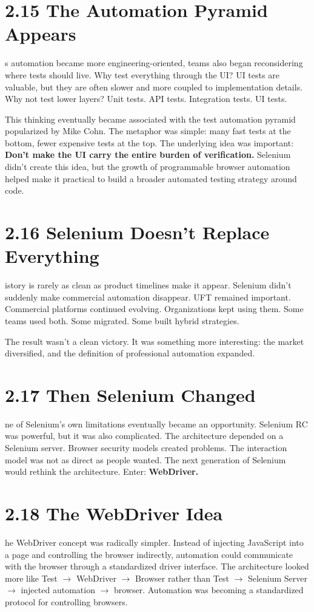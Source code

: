 \documentclass[11pt, a4paper, openany]{book}
\newcommand{\initialcap}[1]{{\fontfamily{lmss}\selectfont\huge\textbf{#1}}}
\begin{document}
\section{2.15 The Automation Pyramid Appears}
\noindent \initialcap{A}s automation became more engineering-oriented, teams also began reconsidering where tests should live. Why test everything through the UI? UI tests are valuable, but they are often slower and more coupled to implementation details. Why not test lower layers? Unit tests. API tests. Integration tests. UI tests.

This thinking eventually became associated with the test automation pyramid popularized by Mike Cohn. The metaphor was simple: many fast tests at the bottom, fewer expensive tests at the top. The underlying idea was important: \textbf{Don't make the UI carry the entire burden of verification.} Selenium didn't create this idea, but the growth of programmable browser automation helped make it practical to build a broader automated testing strategy around code.

\section{2.16 Selenium Doesn't Replace Everything}
\noindent \initialcap{H}istory is rarely as clean as product timelines make it appear. Selenium didn't suddenly make commercial automation disappear. UFT remained important. Commercial platforms continued evolving. Organizations kept using them. Some teams used both. Some migrated. Some built hybrid strategies.

The result wasn't a clean victory. It was something more interesting: the market diversified, and the definition of professional automation expanded.

\section{2.17 Then Selenium Changed}
\noindent \initialcap{O}ne of Selenium's own limitations eventually became an opportunity. Selenium RC was powerful, but it was also complicated. The architecture depended on a Selenium server. Browser security models created problems. The interaction model was not as direct as people wanted. The next generation of Selenium would rethink the architecture. Enter: \textbf{WebDriver.}

\section{2.18 The WebDriver Idea}
\noindent \initialcap{T}he WebDriver concept was radically simpler. Instead of injecting JavaScript into a page and controlling the browser indirectly, automation could communicate with the browser through a standardized driver interface. The architecture looked more like Test $\rightarrow$ WebDriver $\rightarrow$ Browser rather than Test $\rightarrow$ Selenium Server $\rightarrow$ injected automation $\rightarrow$ browser. Automation was becoming a standardized protocol for controlling browsers.
\end{document}
